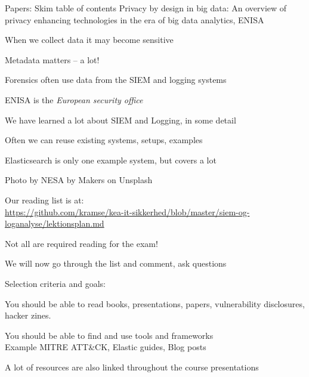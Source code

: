 \documentclass[Screen16to9,17pt]{foils}
\begin{document}
\begin{list1}
\item Papers: Skim table of contents Privacy by design in big data: An overview of privacy enhancing technologies in the era of big data analytics, ENISA
\begin{list2}
\item When we collect data it may become sensitive
\item Metadata matters -- a lot!
\item Forensics often use data from the SIEM and logging systems
\item ENISA is the \emph{European security office}
\end{list2}
\end{list1}




\begin{list1}
\item We have learned a lot about SIEM and Logging, in some detail
\item Often we can reuse existing systems, setups, examples
\item Elasticsearch is only one example system, but covers a lot

\end{list1}
{\small \hfill Photo by NESA by Makers on Unsplash}


\begin{list1}
\item Our reading list is at:\\
{\footnotesize\url{https://github.com/kramse/kea-it-sikkerhed/blob/master/siem-og-loganalyse/lektionsplan.md}}
\item Not all are required reading for the exam!
\item We will now go through the list and comment, ask questions
\item Selection criteria and goals:
\begin{list2}
\item You should be able to read books, presentations, papers, vulnerability disclosures, hacker zines.
\item You should be able to find and use tools and frameworks\\
Example MITRE ATT\&CK, Elastic guides, Blog posts
\end{list2}
\item A lot of resources are also linked throughout the course presentations
\end{list1}
\end{document}
